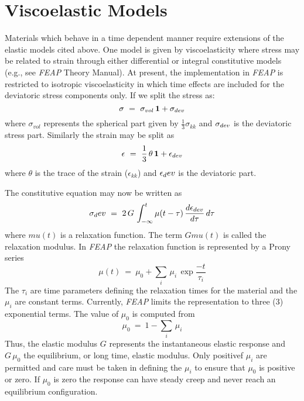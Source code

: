 \section{Viscoelastic Models}
\label{viscmod}

Materials which behave in a time dependent manner require extensions of the
elastic models cited above.  One model is given by viscoelasticity where
stress may be related to strain through either differential or integral
constitutive models (e.g., see {\sl FEAP} Theory Manual).  At present, the
implementation in {\sl FEAP} is restricted to isotropic viscoelasticity in
which time effects are included for the deviatoric stress components only.
If we split the stress as:
\begin{equation}
\mathbf{\sigma} ~=~ \sigma_{vol} \, \boldsymbol{1} + \mathbf{\sigma}_{dev}
\end{equation}
where $\sigma_{vol}$ represents the spherical part given by
$\frac{1}{3} \sigma_{kk}$ and $\mathbf{\sigma}_{dev}$ is the deviatoric stress part.
Similarly the strain may be split as
\begin{equation}
\mathbf{\epsilon} ~=~ \frac{1}{3} \, \theta \, \boldsymbol{1} + \mathbf{\epsilon}_{dev}
\end{equation}
where $\theta$ is the trace of the strain ($\epsilon_{kk}$)
and $\mathbf{\epsilon}_dev$ is the deviatoric part.

The constitutive equation may now be written as
\begin{equation}
\mathbf{\sigma}_dev ~=~ 2 \, G \, \int_{-\infty}^t
\mu(t - \tau ) \, \frac{d \mathbf{\epsilon}_{dev}}{d \tau} \, d \tau
\end{equation}
where $mu(t)$ is a relaxation function.  The term $G mu(t)$ is called the
relaxation modulus.   In {\sl FEAP} the relaxation function is represented
by a Prony series
\begin{equation}
\mu(t) ~=~  \mu_0 + \sum_i \, \mu_i \, \exp \frac{-t}{\tau_i}
\end{equation}
The $\tau_i$ are time parameters defining the relaxation times
for the material and the $\mu_i$ are constant terms.  Currently, {\sl FEAP}
limits the representation to three (3) exponential terms.
The value of $\mu_0$ is computed from
\begin{equation}
\mu_0 ~=~  1 - \sum_i \, \mu_i
\end{equation}
Thus, the elastic modulus $G$ represents the instantaneous elastic response
and $G \, \mu_0$ the equilibrium, or long time, elastic modulus.
Only positivef $\mu_i$ are permitted and care must
be taken in defining the $\mu_i$ to ensure that $\mu_0$ is positive or zero.
If $\mu_0$ is zero the response can have steady creep and never reach an
equilibrium configuration.

